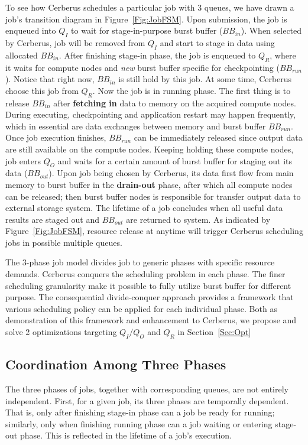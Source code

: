 To see how Cerberus schedules a particular job with 3 queues,
we have drawn a job's transition diagram in Figure~\ref{Fig:JobFSM}.
Upon submission, the job is enqueued into $Q_I$ to wait for stage-in-purpose burst buffer ($BB_{in}$).
When selected by Cerberus, job will be removed from $Q_I$ and
start to stage in data using allocated $BB_{in}$.
After finishing stage-in phase, the job is enqueued to $Q_R$, where it waits for
compute nodes and \textit{new} burst buffer specific for checkpointing ($BB_{run}$).
Notice that right now, $BB_{in}$ is still hold by this job.
At some time, Cerberus choose this job from $Q_R$.
Now the job is in running phase.
The first thing is to release $BB_{in}$ after \textbf{fetching in} data to memory on the acquired compute nodes.
During executing, checkpointing and application restart may happen frequently, which in essential
are data exchanges between memory and burst buffer $BB_{run}$.
Once job execution finishes, $BB_{run}$ can be immediately released since
output data are still available on the compute nodes.
Keeping holding these compute nodes, job enters $Q_O$ and waits for a certain amount of burst
buffer for staging out its data ($BB_{out}$).
Upon job being chosen by Cerberus, its data first flow from main memory to burst buffer
in the \textbf{drain-out} phase, after which all compute nodes can be released;
then burst buffer nodes is responsible for transfer output data to external storage system.
The lifetime of a job concludes when all useful data results are staged out
and $BB_{out}$ are returned to system.
As indicated by Figure~\ref{Fig:JobFSM}, resource release at anytime will trigger Cerberus
scheduling jobs in possible multiple queues.

The 3-phase job model divides job to generic phases with specific resource demands.
Cerberus conquers the scheduling problem in each phase.
The finer scheduling granularity make it possible to fully utilize burst buffer for different purpose.
The consequential divide-conquer approach provides a framework that various scheduling
policy can be applied for each individual phase.
Both as demonstration of this framework and enhancement to Cerberus,
we propose and solve 2 optimizations targeting $Q_I/Q_O$ and $Q_R$ in Section~\ref{Sec:Opt}

\subsection{Coordination Among Three Phases}
The three phases of jobs, together with corresponding queues, are not entirely independent.
First, for a given job, its three phases are temporally dependent.
That is, only after finishing stage-in phase can a job be ready for running;
similarly, only when finishing running phase can a job waiting or entering stage-out phase.
This is reflected in the lifetime of a job's execution.

